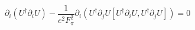 \begin{equation}
\partial_i(U^\dag \partial_i U) -\frac{1}{e^2 F_\pi^2}  \partial_i (U^\dag  \partial_j U[U^\dag \partial_i U, U^\dag \partial_j U])=0     \label{eq:stat}
\end{equation}

